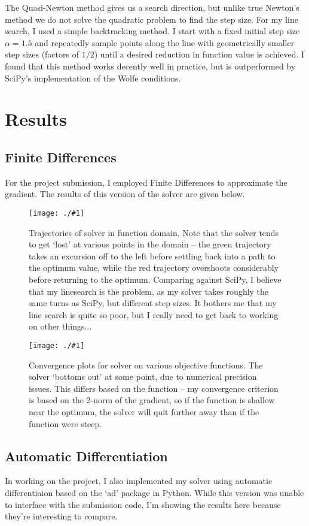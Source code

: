 \documentclass{article}
\newcommand{\img}[2]{
	\begin{figure}[H]
	\centering%
	\texttt{[image: ./\#1]}
	\caption{#2}     %
	\label{fig:#1}   %
	\end{figure} }
\begin{document}
The Quasi-Newton method gives us a search direction, but unlike true Newton's method we do not solve the quadratic problem to find the step size. For my line search, I used a simple backtracking method. I start with a fixed initial step size $\alpha=1.5$ and repeatedly sample points along the line with geometrically smaller step sizes (factors of $1/2$) until a desired reduction in function value is achieved. I found that this method works decently well in practice, but is outperformed by SciPy's implementation of the Wolfe conditions.

\section{Results}

\subsection{Finite Differences}
For the project submission, I employed Finite Differences to approximate the gradient. The results of this version of the solver are given below.

\img{trajectories_fd}{Trajectories of solver in function domain. Note that the solver tends to get `lost' at various points in the domain -- the green trajectory takes an excursion off to the left before settling back into a path to the optimum value, while the red trajectory overshoots considerably before returning to the optimum. Comparing against SciPy, I believe that my linesearch is the problem, as my solver takes roughly the same turns as SciPy, but different step sizes. It bothers me that my line search is quite so poor, but I really need to get back to working on other things...}

\img{convergence_fd}{Convergence plots for solver on various objective functions. The solver `bottoms out' at some point, due to numerical precision issues. This differs based on the function -- my convergence criterion is based on the 2-norm of the gradient, so if the function is shallow near the optimum, the solver will quit further away than if the function were steep.}

\subsection{Automatic Differentiation}
In working on the project, I also implemented my solver using automatic differentiaion based on the `ad' package in Python. While this version was unable to interface with the submission code, I'm showing the results here because they're interesting to compare.
\end{document}

